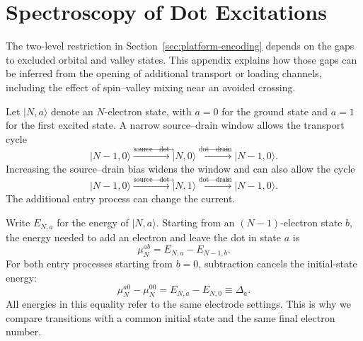 \FloatBarrier
\section{Spectroscopy of Dot Excitations}
\label{app:dot-spectroscopy}
\label{sec:energy-spectroscopy}
\label{sec:measurement-excited-states}

The two-level restriction in Section~\ref{sec:platform-encoding} depends
on the gaps to excluded orbital and valley states. This appendix
explains how those gaps can be inferred from the opening of additional
transport or loading channels, including the effect of spin--valley
mixing near an avoided crossing.

Let $\lvert N,a\rangle$ denote an $N$-electron state, with $a=0$
for the ground state and $a=1$ for the first excited state.
A narrow source--drain window allows the transport cycle
\[
 \lvert N-1,0\rangle
 \xrightarrow{\text{source}\to\text{dot}}\lvert N,0\rangle
 \xrightarrow{\text{dot}\to\text{drain}}\lvert N-1,0\rangle.
\]
Increasing the source--drain bias widens the window and can also
allow the cycle
\[
 \lvert N-1,0\rangle
 \xrightarrow{\text{source}\to\text{dot}}\lvert N,1\rangle
 \xrightarrow{\text{dot}\to\text{drain}}\lvert N-1,0\rangle.
\]
The additional entry process can change the current.

Write $E_{N,a}$ for the energy of $\lvert N,a\rangle$. Starting from an
$(N-1)$-electron state $b$, the energy needed to add an electron
and leave the dot in state $a$ is
\begin{equation}
 \mu_N^{ab}=E_{N,a}-E_{N-1,b}.
 \label{eq:measurement-excited-addition}
\end{equation}
For both entry processes starting from $b=0$, subtraction cancels
the initial-state energy:
\begin{equation}
 \mu_N^{a0}-\mu_N^{00}=E_{N,a}-E_{N,0}\equiv\Delta_a.
 \label{eq:measurement-excitation-gap}
\end{equation}
All energies in this equality refer to the same electrode settings.
This is why we compare transitions with a common initial state
and the same final electron number.

